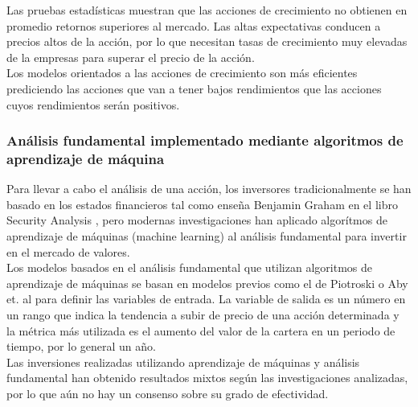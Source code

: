 Las pruebas estadísticas muestran que las acciones de crecimiento no obtienen en promedio retornos superiores al mercado. Las altas expectativas conducen a precios altos de la acción, por lo que necesitan tasas de crecimiento muy elevadas de la empresas para superar el precio de la acción.\\

Los modelos orientados a las acciones de crecimiento son más eficientes prediciendo las acciones que van a tener bajos rendimientos que las acciones cuyos rendimientos serán positivos.\\

\subsubsection{An\'alisis fundamental implementado mediante algoritmos de aprendizaje de m\'aquina}

Para llevar a cabo el an\'alisis de una acci\'on, los inversores tradicionalmente se han basado en los estados financieros tal como enseña Benjamin Graham en el libro Security Analysis \cite{BenjaminGraham2009}, pero modernas investigaciones han aplicado algor\'itmos de aprendizaje de m\'aquinas (machine learning) al an\'alisis fundamental para invertir en el mercado de valores.\\

Los modelos basados en el an\'alisis fundamental que utilizan algoritmos de aprendizaje de m\'aquinas se basan en modelos previos como el de Piotroski \cite{Piotroski2000} o Aby et. al \cite{Aby2001} para definir las variables de entrada. La variable de salida es un n\'umero en un rango que indica la tendencia a subir de precio de una acci\'on determinada y la m\'etrica m\'as utilizada es el aumento del valor de la cartera en un periodo de tiempo, por lo general un año.\\

Las inversiones realizadas utilizando aprendizaje de m\'aquinas y an\'alisis fundamental han obtenido resultados mixtos seg\'un las investigaciones analizadas, por lo que a\'un no hay un consenso sobre su grado de efectividad.\\
